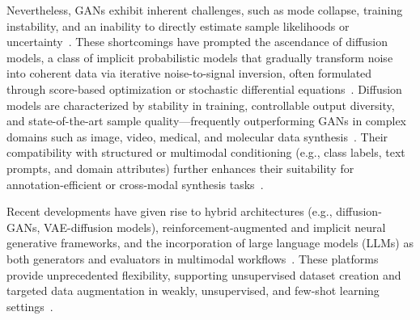 \documentclass[sigconf]{acmart}
\begin{document}
Nevertheless, GANs exhibit inherent challenges, such as mode collapse, training instability, and an inability to directly estimate sample likelihoods or uncertainty~\cite{ref5,ref13,ref75,ref90}. These shortcomings have prompted the ascendance of diffusion models, a class of implicit probabilistic models that gradually transform noise into coherent data via iterative noise-to-signal inversion, often formulated through score-based optimization or stochastic differential equations~\cite{ref10,ref16,ref21,ref22,ref23,ref24,ref25,ref75,ref81,ref82,ref89}. Diffusion models are characterized by stability in training, controllable output diversity, and state-of-the-art sample quality---frequently outperforming GANs in complex domains such as image, video, medical, and molecular data synthesis~\cite{ref21,ref24,ref25,ref75,ref81,ref89}. Their compatibility with structured or multimodal conditioning (e.g., class labels, text prompts, and domain attributes) further enhances their suitability for annotation-efficient or cross-modal synthesis tasks~\cite{ref21,ref23,ref24,ref82,ref89,ref90}.

Recent developments have given rise to hybrid architectures (e.g., diffusion-GANs, VAE-diffusion models), reinforcement-augmented and implicit neural generative frameworks, and the incorporation of large language models (LLMs) as both generators and evaluators in multimodal workflows~\cite{ref2,ref6,ref13,ref16,ref18,ref22,ref23,ref82,ref89,ref90}. These platforms provide unprecedented flexibility, supporting unsupervised dataset creation and targeted data augmentation in weakly, unsupervised, and few-shot learning settings~\cite{ref12,ref23,ref26,ref27,ref64,ref81}.
\end{document}
